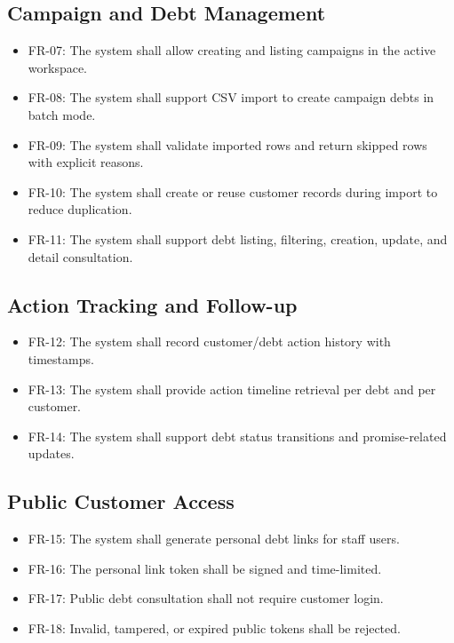 \subsection{Campaign and Debt Management}
\begin{itemize}
  \item FR-07: The system shall allow creating and listing campaigns in the active workspace.
  \item FR-08: The system shall support CSV import to create campaign debts in batch mode.
  \item FR-09: The system shall validate imported rows and return skipped rows with explicit reasons.
  \item FR-10: The system shall create or reuse customer records during import to reduce duplication.
  \item FR-11: The system shall support debt listing, filtering, creation, update, and detail consultation.
\end{itemize}

\subsection{Action Tracking and Follow-up}
\begin{itemize}
  \item FR-12: The system shall record customer/debt action history with timestamps.
  \item FR-13: The system shall provide action timeline retrieval per debt and per customer.
  \item FR-14: The system shall support debt status transitions and promise-related updates.
\end{itemize}

\subsection{Public Customer Access}
\begin{itemize}
  \item FR-15: The system shall generate personal debt links for staff users.
  \item FR-16: The personal link token shall be signed and time-limited.
  \item FR-17: Public debt consultation shall not require customer login.
  \item FR-18: Invalid, tampered, or expired public tokens shall be rejected.
\end{itemize}

